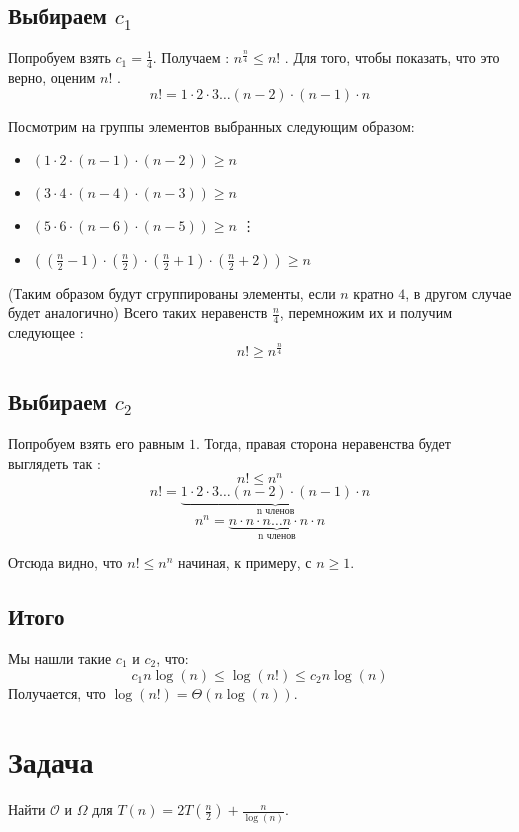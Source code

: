 \documentclass{article}
\begin{document}
\subsection{Выбираем $c_{1}$}
Попробуем взять $c_{1} = \frac{1}{4}$.  Получаем : $n^{\frac{n}{4}} \leq n!$ . 
Для того, чтобы показать, что это верно, оценим $n!$ .  
$$n! = 1 \cdot 2 \cdot 3 \dots (n - 2) \cdot (n - 1) \cdot n$$

Посмотрим на группы элементов выбранных следующим образом:
	\begin{itemize}
		\item $(1 \cdot 2 \cdot (n - 1) \cdot(n - 2)) \geq n$ 
		\item $(3 \cdot 4 \cdot (n - 4) \cdot (n - 3)) \geq n$ 
		\item $(5 \cdot 6 \cdot (n - 6) \cdot (n - 5)) \geq n$
		\newline
		\vdots
		\item $((\frac{n}{2} - 1) \cdot (\frac{n}{2}) \cdot (\frac{n}{2} + 1) \cdot (\frac{n}{2} + 2)) \geq n$
	\end{itemize}
	(Таким образом будут сгруппированы элементы, если $n$ кратно $4$, в другом случае будет аналогично)
\newline
Всего таких неравенств $\frac{n}{4}$, перемножим их и получим следующее :
$$ n! \geq n^{\frac{n}{4}}$$
\subsection{Выбираем $c_{2}$}
Попробуем взять его равным $1$.  Тогда, правая сторона неравенства будет выглядеть так : 
$$n! \leq n^{n}$$
$$n! = \underbrace{1 \cdot 2 \cdot 3 \dots (n - 2) \cdot (n - 1) \cdot n}_{\mbox{n членов}}$$
$$n^{n} = \underbrace{n \cdot n \cdot n \dots n \cdot n \cdot n}_{\mbox{n членов}}$$
\newline

Отсюда видно, что $n! \leq n^{n}$ начиная, к примеру, с $n \geq 1$.
\subsection{Итого}
Мы нашли такие $c_{1}$ и $c_{2}$, что:   $$c_{1}n\log(n) \leq \log(n!) \leq c_{2} n\log(n)$$ Получается, что $\log(n!) = \Theta(n\log(n))$.
\section{Задача }

Найти $\mathcal{O}$  и  $\Omega$ для $T(n) = 2T(\frac{n}{2}) + \frac{n}{\log(n)}$.
\end{document}
